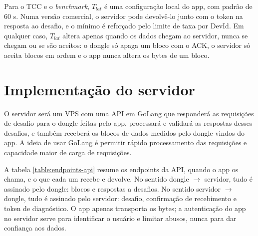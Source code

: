 \documentclass[
	12pt,
	article,			%
	oneside,
	a4paper,
	english,
	brazil				%
	]{abntex2}
\begin{document}
Para o TCC e o \textit{benchmark}, $T_{lat}$ é uma configuração local do app, com padrão de 60 s. Numa versão comercial, o servidor pode devolvê-lo junto com o token na resposta ao desafio, e o mínimo
é reforçado pelo limite de taxa por DevId. Em qualquer caso, $T_{lat}$ altera apenas quando os dados chegam ao servidor, nunca se chegam ou se são aceitos: o dongle só apaga um bloco com o ACK, o
servidor só aceita blocos em ordem e o app nunca altera os bytes de um bloco.

\section{Implementação do servidor}

O servidor será um VPS com uma API em GoLang que responderá as requisições de desafio para o dongle feitas pelo app, processará e validará
as respostas desses desafios, e também receberá os blocos de dados medidos pelo dongle vindos do app. A ideia de usar GoLang é permitir 
rápido processamento das requisições e capacidade maior de carga de requisições.

A tabela \ref{table:endpoints-api} resume os endpoints da API, quando o app os chama, e o que cada um recebe e devolve. No sentido dongle
$\rightarrow$ servidor, tudo é assinado pelo dongle: blocos e respostas a desafios. No sentido servidor $\rightarrow$ dongle, tudo é assinado
pelo servidor: desafio, confirmação de recebimento e token de diagnóstico. O app apenas transporta os bytes; a autenticação do app no
servidor serve para identificar o usuário e limitar abusos, nunca para dar confiança aos dados.
\end{document}
